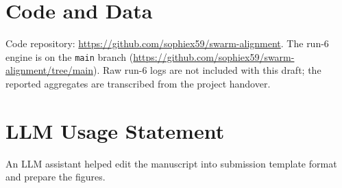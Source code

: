 \documentclass{article}
\newcommand{\repository}{\url{https://github.com/sophiex59/swarm-alignment}}
\newcommand{\runbranch}{\url{https://github.com/sophiex59/swarm-alignment/tree/main}}
\begin{document}
\section*{Code and Data}
Code repository: \repository. The run-6 engine is on the \texttt{main} branch (\runbranch). Raw run-6 logs are not included with this draft; the reported aggregates are transcribed from the project handover.

\section*{LLM Usage Statement}
An LLM assistant helped edit the manuscript into submission template format and prepare the figures. 



\end{document}
